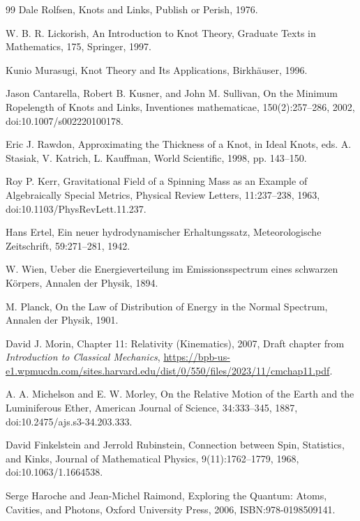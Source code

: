 \begin{thebibliography}{99}
     Dale Rolfsen, Knots and Links, Publish or Perish, 1976.

     W. B. R. Lickorish, An Introduction to Knot Theory, Graduate Texts in Mathematics, 175, Springer, 1997.

     Kunio Murasugi, Knot Theory and Its Applications, Birkh{\"a}user, 1996.

     Jason Cantarella, Robert B. Kusner, and John M. Sullivan, On the Minimum Ropelength of Knots and Links, Inventiones mathematicae, 150(2):257--286, 2002, doi:10.1007/s002220100178.

     Eric J. Rawdon, Approximating the Thickness of a Knot, in Ideal Knots, eds. A. Stasiak, V. Katrich, L. Kauffman, World Scientific, 1998, pp. 143--150.

     Roy P. Kerr, Gravitational Field of a Spinning Mass as an Example of Algebraically Special Metrics, Physical Review Letters, 11:237--238, 1963, doi:10.1103/PhysRevLett.11.237.

     Hans Ertel, Ein neuer hydrodynamischer Erhaltungssatz, Meteorologische Zeitschrift, 59:271--281, 1942.

     W. Wien, Ueber die Energieverteilung im Emissionsspectrum eines schwarzen K{\"o}rpers, Annalen der Physik, 1894.

     M. Planck, On the Law of Distribution of Energy in the Normal Spectrum, Annalen der Physik, 1901.

     David J. Morin, Chapter 11: Relativity (Kinematics), 2007, Draft chapter from \emph{Introduction to Classical Mechanics}, \url{https://bpb-us-e1.wpmucdn.com/sites.harvard.edu/dist/0/550/files/2023/11/cmchap11.pdf}.

     A. A. Michelson and E. W. Morley, On the Relative Motion of the Earth and the Luminiferous Ether, American Journal of Science, 34:333--345, 1887, doi:10.2475/ajs.s3-34.203.333.

     David Finkelstein and Jerrold Rubinstein, Connection between Spin, Statistics, and Kinks, Journal of Mathematical Physics, 9(11):1762--1779, 1968, doi:10.1063/1.1664538.

     Serge Haroche and Jean-Michel Raimond, Exploring the Quantum: Atoms, Cavities, and Photons, Oxford University Press, 2006, ISBN:978-0198509141.


\end{thebibliography}
